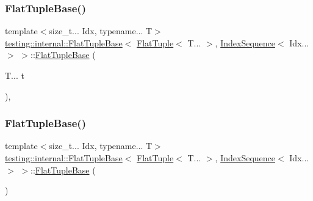 \subsubsection{\texorpdfstring{FlatTupleBase()}{FlatTupleBase()}\hspace{0.1cm}{\footnotesize\ttfamily [2/4]}}
{\footnotesize\ttfamily template$<$size\+\_\+t... Idx, typename... T$>$ \\
\mbox{\hyperlink{structtesting_1_1internal_1_1_flat_tuple_base}{testing\+::internal\+::\+Flat\+Tuple\+Base}}$<$ \mbox{\hyperlink{classtesting_1_1internal_1_1_flat_tuple}{Flat\+Tuple}}$<$ T... $>$, \mbox{\hyperlink{structtesting_1_1internal_1_1_index_sequence}{Index\+Sequence}}$<$ Idx... $>$ $>$\+::\mbox{\hyperlink{structtesting_1_1internal_1_1_flat_tuple_base}{Flat\+Tuple\+Base}} (\begin{DoxyParamCaption}\item[{T...}]{t }\end{DoxyParamCaption})\hspace{0.3cm}{\ttfamily [inline]}, {\ttfamily [explicit]}}

\mbox{\label{structtesting_1_1internal_1_1_flat_tuple_base_3_01_flat_tuple_3_01_t_8_8_8_01_4_00_01_index_sequence_3_01_idx_8_8_8_01_4_01_4_ae509b146e74176bceddc0d2f2d1cb0dc}} 
\subsubsection{\texorpdfstring{FlatTupleBase()}{FlatTupleBase()}\hspace{0.1cm}{\footnotesize\ttfamily [3/4]}}
{\footnotesize\ttfamily template$<$size\+\_\+t... Idx, typename... T$>$ \\
\mbox{\hyperlink{structtesting_1_1internal_1_1_flat_tuple_base}{testing\+::internal\+::\+Flat\+Tuple\+Base}}$<$ \mbox{\hyperlink{classtesting_1_1internal_1_1_flat_tuple}{Flat\+Tuple}}$<$ T... $>$, \mbox{\hyperlink{structtesting_1_1internal_1_1_index_sequence}{Index\+Sequence}}$<$ Idx... $>$ $>$\+::\mbox{\hyperlink{structtesting_1_1internal_1_1_flat_tuple_base}{Flat\+Tuple\+Base}} (\begin{DoxyParamCaption}{ }\end{DoxyParamCaption})\hspace{0.3cm}{\ttfamily [default]}}

